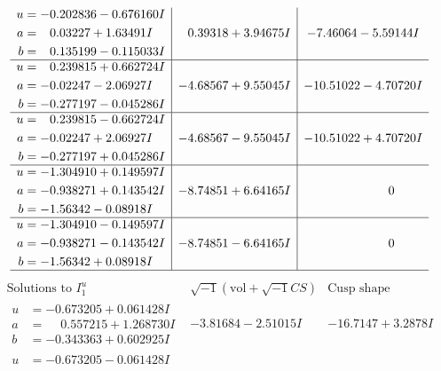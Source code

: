 \documentclass[1p]{elsarticle_modified}
\theoremstyle{definition}
\newcommand{\I}{\sqrt{-1}}
\begin{document}
$$\begin{array}{c|c|c}
\begin{aligned}
u &= -0.202836 - 0.676160 I \\
a &= \phantom{-}0.03227 + 1.63491 I \\
b &= \phantom{-}0.135199 - 0.115033 I\end{aligned}
 & \phantom{-}0.39318 + 3.94675 I & -7.46064 - 5.59144 I \\ \hline\begin{aligned}
u &= \phantom{-}0.239815 + 0.662724 I \\
a &= -0.02247 - 2.06927 I \\
b &= -0.277197 - 0.045286 I\end{aligned}
 & -4.68567 + 9.55045 I & -10.51022 - 4.70720 I \\ \hline\begin{aligned}
u &= \phantom{-}0.239815 - 0.662724 I \\
a &= -0.02247 + 2.06927 I \\
b &= -0.277197 + 0.045286 I\end{aligned}
 & -4.68567 - 9.55045 I & -10.51022 + 4.70720 I \\ \hline\begin{aligned}
u &= -1.304910 + 0.149597 I \\
a &= -0.938271 + 0.143542 I \\
b &= -1.56342 - 0.08918 I\end{aligned}
 & -8.74851 + 6.64165 I & \phantom{-0.000000 } 0 \\ \hline\begin{aligned}
u &= -1.304910 - 0.149597 I \\
a &= -0.938271 - 0.143542 I \\
b &= -1.56342 + 0.08918 I\end{aligned}
 & -8.74851 - 6.64165 I & \phantom{-0.000000 } 0\\
 \hline 
 \end{array}$$\newpage$$\begin{array}{c|c|c}  
\text{Solutions to }I^u_{1}& \I (\text{vol} + \sqrt{-1}CS) & \text{Cusp shape}\\
 \hline 
\begin{aligned}
u &= -0.673205 + 0.061428 I \\
a &= \phantom{-}0.557215 + 1.268730 I \\
b &= -0.343363 + 0.602925 I\end{aligned}
 & -3.81684 - 2.51015 I & -16.7147 + 3.2878 I \\ \hline\begin{aligned}
u &= -0.673205 - 0.061428 I \\

\end{aligned}
\end{array}$$
\end{document}
